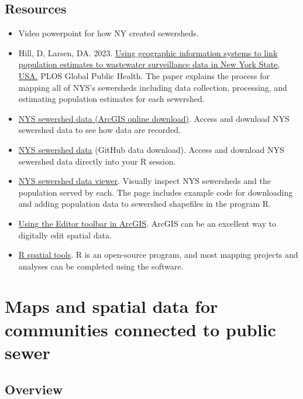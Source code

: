 \documentclass[
]{book}
\begin{document}
\section{Resources}\label{resources}

\begin{itemize}
\item
  Video powerpoint for how NY created sewersheds.
\item
  Hill, D, Larsen, DA. 2023. \href{https://doi.org/10.1371/journal.pgph.0001062}{Using geographic information systems to link population estimates to wastewater surveillance data in New York State, USA.} PLOS Global Public Health. The paper explains the process for mapping all of NYS's sewersheds including data collection, processing, and estimating population estimates for each sewershed.
\item
  \href{https://www.arcgis.com/home/item.html?id=e795007660ae4a1fae5f86b40d065b3a}{NYS sewershed data (ArcGIS online download)}. Access and download NYS sewershed data to see how data are recorded.
\item
  \href{https://github.com/nys-wwsn/ny-sewer-spatial-data}{NYS sewershed data} (GitHub data download). Access and download NYS sewershed data directly into your R session.
\item
  \href{https://dthill196.github.io/NY-Sewershed-Populations/}{NYS sewershed data viewer}. Visually inspect NYS sewersheds and the population served by each. The page includes example code for downloading and adding population data to sewershed shapefiles in the program R.
\item
  \href{https://desktop.arcgis.com/en/arcmap/latest/manage-data/editing-fundamentals/adding-the-editor-toolbar.htm}{Using the Editor toolbar in ArcGIS}. ArcGIS can be an excellent way to digitally edit spatial data.
\item
  \href{https://r-spatial.org/}{R spatial tools}. R is an open-source program, and most mapping projects and analyses can be completed using the software.
\end{itemize}

\chapter{Maps and spatial data for communities connected to public sewer}\label{maps-and-spatial-data-for-communities-connected-to-public-sewer}

\section{Overview}\label{overview}
\end{document}
